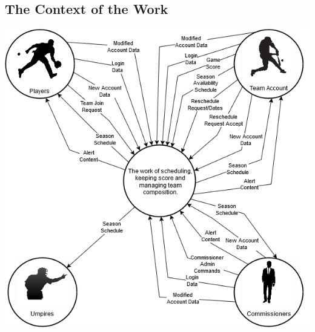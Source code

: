 \documentclass[12pt]{article}
\begin{document}
\subsection{The Context of the Work}
\includegraphics[scale=0.6]{6_2_context_diagram.png}
\end{document}
